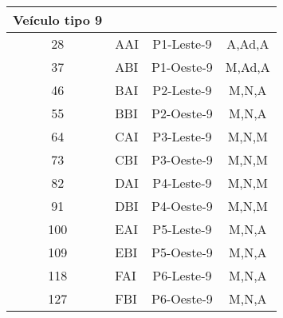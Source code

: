 \documentclass[
	12pt,				%
	openright,			%
	twoside,			%
	a4paper,			%
	english,			%
	french,				%
	spanish,			%
	brazil				%
	]{abntex2}
\begin{document}
\begin{apendicesenv}
\begin{table}[h]
\begin{tabular}{c l c c}
\hline
Veículo tipo 9 & \\
\hline

28 & AAI & P1-Leste-9 & A,Ad,A\\
37 & ABI & P1-Oeste-9 & M,Ad,A\\
46 & BAI & P2-Leste-9 & M,N,A\\
55 & BBI & P2-Oeste-9 & M,N,A\\
64 & CAI & P3-Leste-9 & M,N,M\\
73 & CBI & P3-Oeste-9 & M,N,M\\
82 & DAI & P4-Leste-9 & M,N,M\\
91 & DBI & P4-Oeste-9 & M,N,M\\
100 & EAI & P5-Leste-9 & M,N,A\\
109 & EBI & P5-Oeste-9 & M,N,A\\
118 & FAI & P6-Leste-9 & M,N,A\\
127 & FBI & P6-Oeste-9 & M,N,A\\

\bottomrule
\end{tabular}
\end{table}


\end{apendicesenv}










\end{document}
